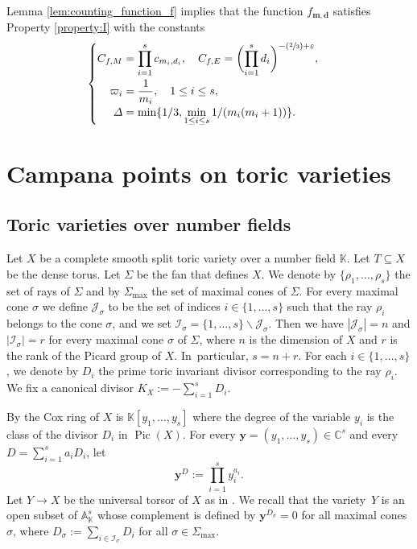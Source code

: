 \documentclass[JEP,XML,SOM,Unicode,published]{cedram}
\newcommand{\Psfrac}[2]{(\sfrac{#1}{#2})}
\let\vardel\varDelta
\newcommand{\bfy}{\boldsymbol{y}}
\newcommand{\bfm}{{\boldsymbol{m}}}
\newcommand{\bfd}{\boldsymbol{d}}
\newcommand\CC{\mathbb{C}}
\newcommand{\KK}{\mathbb{K}}
\newcommand{\A}{\mathbb{A}}
\newcommand{\ii}[1]{\mathcal{J}_{#1}}
\newcommand{\ic}[1]{\mathcal{I}_{#1}}
\DeclareMathOperator{\pic}{Pic}
\theoremstyle{definition}
\numberwithin{theorem}{section}
\begin{document}
Lemma \ref{lem:counting_function_f} implies that the function $f_{\bfm, \bfd}$ satisfies Property \ref{property:I} with the constants
\[
\begin{cases}
\begin{aligned}
C_{f,M} &= \prod_{i=1}^s c_{m_i,d_i}, \quad C_{f,E} = \biggl(\prod_{i=1}^sd_i\biggr)^{-\Psfrac23+\varepsilon},\\
\varpi_i&= \frac{1}{m_i}, \quad 1\leq i\leq s,\\
\vardel &= \min \{ 1/3 , \min_{1\leq i\leq s}1/(m_i(m_i+1)) \}.
\end{aligned}
\end{cases}
\]

\section{Campana points on toric varieties}
\label{sec:Campana_points_on_toric_varieties}
\subsection{Toric varieties over number fields}

Let $X$ be a complete smooth split toric variety over a number field $\KK$.
Let $T\subseteq X$ be the dense torus.
Let $\Sigma$ be the fan that defines $X$.
We denote by $\{\rho_1,\dots,\rho_s\}$ the set of rays of $\Sigma$
and by $\Sigma_{\max}$ the set of maximal cones of $\Sigma$.
For every maximal cone $\sigma$ we define $\ii{\sigma}$ to be the set of indices
$i\in\{1,\dots,s\}$ such that the ray $\rho_i$ belongs to the cone $\sigma$,
and we set $\ic{\sigma}=\{1,\dots,s\}\smallsetminus \ii{\sigma}$.
Then we have $|\ii{\sigma}|=n$ and $|\ic{\sigma}|=r$ for every maximal cone $\sigma$ of $\Sigma$,
where $n$ is the dimension of $X$ and $r$ is the rank of the Picard group of $X$.
In~particular, $s=n+r$.
For each $i\in\{1,\dots,s\}$, we denote by $D_i$ the prime toric invariant divisor
corresponding to the ray $\rho_i$. We fix a canonical divisor $K_X:=-\sum_{i=1}^s D_i$.

By \cite{MR1299003} the Cox ring of $X$ is $\KK[y_1,\dots,y_s]$
where the degree of the variable $y_i$ is
the class of the divisor $D_i$ in $\pic(X)$.
For every $\bfy=(y_1,\dots,y_s)\in \CC^{s}$ and every $D=\sum_{i=1}^s a_i D_i$,
let \[
\bfy^D:=\prod_{i=1}^sy_i^{a_i}.
\]
Let $Y\to X$ be the universal torsor of $X$
as in \cite[\S8]{MR1679841}. We recall that the variety~$Y$ is an open subset of
$\A^{s}_{\KK}$ whose complement is defined by $\bfy^{D_\sigma}=0$ for all
maximal cones $\sigma$, where
$
D_\sigma:=\sum_{i\in\ic{\sigma}}D_i
$
for all $\sigma\in\Sigma_{\max}$.
\end{document}
